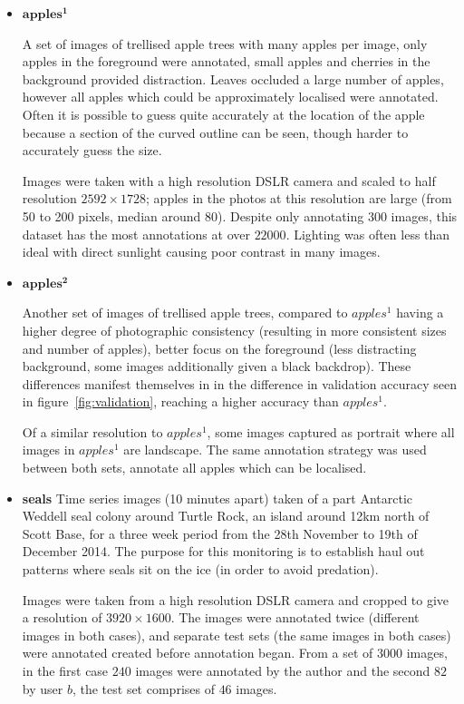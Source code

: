 \begin{itemize}
    \item{$\mathbf{apples^1}$}

A set of images of trellised apple trees with many apples per image, only apples in the foreground were annotated, small apples and cherries in the background provided distraction. Leaves occluded a large number of apples, however all apples which could be approximately localised were annotated. Often it is possible to guess quite accurately at the location of the apple because a section of the curved outline can be seen, though harder to accurately guess the size. 

Images were taken with a high resolution DSLR camera and scaled to half resolution $2592\times1728$; apples in the photos at this resolution are large (from 50 to 200 pixels, median around 80). Despite only annotating 300 images, this dataset has the most annotations at over $22000$. Lighting was often less than ideal with direct sunlight causing poor contrast in many images.
    
    \item{$\mathbf{apples^2}$}
    
Another set of images of trellised apple trees, compared to \emph{$apples^1$} having a higher degree of  photographic consistency (resulting in more consistent sizes and number of apples), better focus on the foreground (less distracting background, some images additionally given a black backdrop). These differences manifest themselves in  in the difference in validation accuracy seen in figure~\ref{fig:validation}, reaching a higher accuracy than \emph{$apples^1$}.

Of a similar resolution to \emph{$apples^1$}, some images captured as portrait where all images in \emph{$apples^1$} are landscape. The same annotation strategy was used between both sets, annotate all apples which can be localised.

    \item{\bf{seals}}
Time series images (10 minutes apart) taken of a part Antarctic Weddell seal colony around Turtle Rock, an island around 12km north of Scott Base, for a three week period from the 28th November to 19th of December 2014. The purpose for this monitoring is to establish haul out patterns where seals sit on the ice (in order to avoid predation).  

Images were taken from a high resolution DSLR camera and cropped to give a resolution of $3920\times1600$. The images were annotated twice (different images in both cases), and separate test sets (the same images in both cases) were annotated created before annotation began. From a set of $3000$ images, in the first case $240$ images were annotated by the author and the second $82$ by user $b$, the test set comprises of $46$ images.


\end{itemize}

